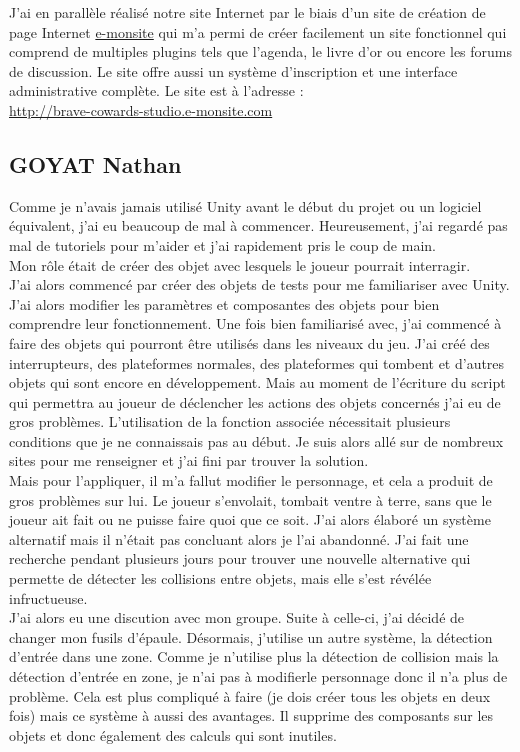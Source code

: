 \documentclass[a4paper]{article}
\begin{document}
\pagebreak
J'ai en parallèle réalisé notre site Internet par le biais d'un site de création de page Internet \href{http://manager.e-monsite.com/site/welcome/begin}{e-monsite} qui m'a permi de créer facilement un site fonctionnel qui comprend de multiples plugins tels que l'agenda, le livre d'or ou encore les forums de discussion. Le site offre aussi un système d'inscription et une interface administrative complète. Le site est à l'adresse :\\
\url{http://brave-cowards-studio.e-monsite.com}



\pagebreak


\subsection{GOYAT Nathan}
\vspace{0.5 cm}


Comme je n’avais jamais utilisé Unity avant le début du projet ou un logiciel équivalent, j’ai eu beaucoup de mal à commencer. Heureusement, j’ai regardé pas mal de tutoriels pour m’aider et j’ai rapidement pris le coup de main.\\
Mon rôle était de créer des objet avec lesquels le joueur pourrait interragir.\\
J'ai alors commencé par créer des objets de tests pour me familiariser avec Unity. J'ai alors modifier les paramètres et composantes des objets pour bien comprendre leur fonctionnement. Une fois bien familiarisé avec, j'ai commencé à faire des objets qui pourront être utilisés dans les niveaux du jeu. J'ai créé des interrupteurs, des plateformes normales, des plateformes qui tombent et d'autres objets qui sont encore en développement. Mais au moment de l'écriture du script qui permettra au joueur de déclencher les actions des objets concernés j'ai eu de gros problèmes. L'utilisation de la fonction associée nécessitait plusieurs conditions que je ne connaissais pas au début. Je suis alors allé sur de nombreux sites pour me renseigner et j'ai fini par trouver la solution.\\
Mais pour l'appliquer, il m'a fallut modifier le personnage, et cela a produit de gros problèmes sur lui. Le joueur s'envolait, tombait ventre à terre, sans que le joueur ait fait ou ne puisse faire quoi que ce soit. J'ai alors élaboré un système alternatif mais il n'était pas concluant alors je l'ai abandonné. J'ai fait une recherche pendant plusieurs jours pour trouver une nouvelle alternative qui permette de détecter les collisions entre objets, mais elle s'est révélée infructueuse.\\
J'ai alors eu une discution avec mon groupe. Suite à celle-ci, j'ai décidé de changer mon fusils d'épaule. Désormais, j'utilise un autre système, la détection d'entrée dans une zone. Comme je n'utilise plus la détection de collision mais la détection d'entrée en zone, je n'ai pas à modifierle personnage donc il n'a plus de problème. Cela est plus compliqué à faire (je dois créer tous les objets en deux fois) mais ce système à aussi des avantages. Il supprime des composants sur les objets et donc également des calculs qui sont inutiles. \\
\end{document}
